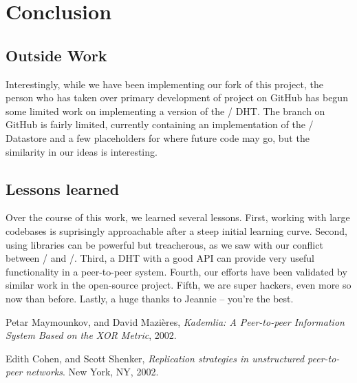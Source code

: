 \documentclass[11pt,twocolumn]{article}
\begin{document}
\section{Conclusion}
\label{sec:conclusion}

\subsection{Outside Work}
Interestingly, while we have been implementing our fork of this project, the person who has taken over primary development of project on GitHub has begun some limited work on implementing a version of the \Kademlia/ DHT.
The branch on GitHub is fairly limited, currently containing an implementation of the \Kademlia/ Datastore and a few placeholders for where future code may go, but the similarity in our ideas is interesting.

\subsection{Lessons learned}
Over the course of this work, we learned several lessons.
First, working with large codebases is suprisingly approachable after a steep initial learning curve.
Second, using libraries can be powerful but treacherous, as we saw with our conflict between \Entangled/ and \Tornado/.
Third, a DHT with a good API can provide very useful functionality in a peer-to-peer system.
Fourth, our efforts have been validated by similar work in the open-source project.
Fifth, we are super hackers, even more so now than before.
Lastly, a huge thanks to Jeannie -- you're the best.

\begin{thebibliography}{9}

  Petar Maymounkov, and David Mazi\`{e}res,
  \emph{Kademlia: A Peer-to-peer Information System Based on the XOR Metric},
  2002.

  Edith Cohen, and Scott Shenker,
  \emph{Replication strategies in unstructured peer-to-peer networks}.
  New York, NY,
  2002.
\end{thebibliography}
\end{document}
